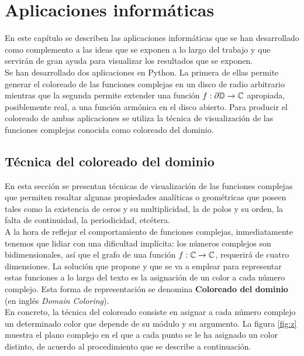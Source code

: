 \chapter{Aplicaciones informáticas}
\label{cap:aplicacion}

En este capítulo se describen las aplicaciones informáticas que se han desarrollado como complemento a las ideas que se exponen a lo largo del trabajo y que servirán de gran ayuda para visualizar los resultados que se exponen. \\

Se han desarrollado dos aplicaciones en Python. La primera de ellas permite generar el coloreado de las funciones complejas en un disco de radio arbitrario mientras que la segunda permite extender una función $f: \partial \mathbb{D} \to \mathbb{C}$ apropiada, posiblemente real, a una función armónica en el disco abierto. Para producir el coloreado de ambas aplicaciones se utiliza la técnica de visualización de las funciones complejas conocida como coloreado del dominio. \\

\section{Técnica del coloreado del dominio}

En esta sección se presentan técnicas de visualización de las funciones complejas que permiten resaltar algunas propiedades analíticas o geométricas que poseen tales como la existencia de ceros y su multiplicidad, la de polos y su orden, la falta de continuidad, la periodicidad, etcétera. \\

A la hora de reflejar el comportamiento de funciones complejas, inmediatamente tenemos que lidiar con una dificultad implícita: los números complejos son bidimensionales, así que el grafo de una función $f : \mathbb{C} \to \mathbb{C}$, requerirá de cuatro dimensiones. La solución que propone \cite{Velleman2015} y que se va a emplear para representar estas funciones a lo largo del texto es la asignación de un color a cada número complejo. Esta forma de representación se denomina \textbf{Coloreado del dominio} (en inglés \textit{Domain Coloring}). \\

En concreto, la técnica del coloreado consiste en asignar a cada número complejo un determinado color que depende de su módulo y su argumento. La figura \ref{fig:z} muestra el plano complejo en el que a cada punto se le ha asignado un color distinto, de acuerdo al procedimiento que se describe a continuación. \\

